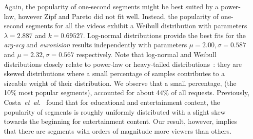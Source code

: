 





Again, the popularity of one-second segments might be best suited by a power-law, however Zipf and Pareto did not fit well. Instead, the popularity of one-second segments for all the videos exhibit a Weibull distribution with parameters $\lambda=2.887$ and $k=0.69527$. Log-normal distributions provide the best fits for the  \emph{arg-scg} and \emph{eurovision} results independently with parameters $\mu = 2.00, \sigma = 0.587$ and $\mu = 2.32, \sigma = 0.567$ respectively. Note that log-normal and Weibull distributions closely relate to power-law or heavy-tailed distributions~\cite{mitzenmacher2004abh,fishman2006hht}: they are skewed distributions where a small percentage of samples contributes to a sizeable weight of their distribution. We observe that a small percentage, (the 10\% most popular segments), accounted for about 44\% of all requests. Previously, Costa~\emph{et~al.}~\cite{costa2004aci} found that for educational and entertainment content, the popularity of segments is roughly uniformly distributed with a slight skew towards the beginning for entertainment content. Our result, however, implies that there are segments with orders of magnitude more viewers than others.


